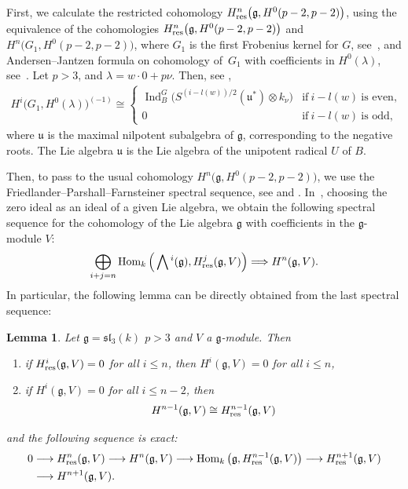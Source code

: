 \documentclass[10pt,a4paper]{amsart}
\numberwithin{equation}{section}
\newtheorem{Lemma}[Theorem]{Lemma}
\begin{document}
First, we calculate the restricted cohomology
$H^n_{\rm res}\big(\mathfrak{g},H^0(p-2,p-2)\big)$, using the equivalence of the cohomologies $H^n_{\rm res}\big(\mathfrak{g},H^0(p-2,p-2)\big)$ and $H^n\big(G_1,H^0(p-2,p-2)\big)$, where $G_1$ is the first Frobenius kernel for $G$, see~\cite[Section~I.9.6]{Jan03}, and Andersen--Jantzen formula on cohomology of~$G_1$ with coefficients in $H^0(\lambda)$, see~\cite{AJ84}. Let $p>3$, and $\lambda=w\cdot 0+p\nu$. Then, see \cite[p.~501]{AJ84},
\begin{gather}
H^i\big(G_1,H^0(\lambda)\big)^{(-1)}\cong
\begin{cases}
\operatorname{Ind}_B^{G}\big(S^{(i-l(w))/2}(\mathfrak{u}^*)\otimes k_{\nu}\big)&\text{if} \ i-l(w)\ \text{is even},
\\
0&\text{if} \ i-l(w)\ \text{is odd},
\end{cases}
\label{eq13}
\end{gather}
where $\mathfrak{u}$ is the maximal nilpotent subalgebra of $\mathfrak{g}$, corresponding to the negative roots. The Lie algebra $\mathfrak{u}$ is the Lie algebra of the unipotent radical $U$ of $B$.

Then, to pass to the usual cohomology $H^n\big(\mathfrak{g},H^0(p-2,p-2)\big)$, we use the Friedlander--Parshall--Farnsteiner spectral sequence, see \cite[Section~5]{FP88} and \cite[Theorem~4.1]{F91}. In~\cite[Theo\-rem~4.1]{F91}, choosing the zero ideal as an ideal of a given Lie algebra, we obtain the following spectral sequence for the cohomology of the Lie algebra $\mathfrak{g}$ with coefficients in the $\mathfrak{g}$-module $V$:
\begin{gather*}
\bigoplus_{i+j=n}\operatorname{Hom}_k\Big(\bigwedge{^i}(\mathfrak{g}),H^j_{\rm res}(\mathfrak{g},V)\Big)\Longrightarrow H^n(\mathfrak{g},V).
\end{gather*}
In particular, the following lemma can be directly obtained from the last spectral sequence:

\begin{Lemma}\label{l5}
Let $\mathfrak{g}=\mathfrak{sl}_3(k)$
$p>3$ and $V$ a $\mathfrak{g}$-module. Then
\begin{enumerate}\itemsep=0pt

\item[$(i)$] if
$H^{i}_{\rm res}(\mathfrak{g},V)=0$ for all $i\leq n$, then $H^{i}(\mathfrak{g},V)=0$ for all $i\leq n$,

\item[$(ii)$] if $H^i(\mathfrak{g},V)=0$ for all $i\leq n-2$, then
\begin{gather}
H^{n-1}(\mathfrak{g},V)\cong H^{n-1}_{\rm res}(\mathfrak{g},V) \label{eq14}
\end{gather}
\end{enumerate}
and the following sequence is exact:
\begin{align}
0&\longrightarrow H^{n}_{\rm res}(\mathfrak{g},V)\longrightarrow H^{n}(\mathfrak{g},V)\longrightarrow \operatorname{Hom}_k\big(\mathfrak{g},H^{n-1}_{\rm res}(\mathfrak{g},V)\big)\longrightarrow H^{n+1}_{\rm res}(\mathfrak{g},V)\nonumber
\\
&\longrightarrow H^{n+1}(\mathfrak{g},V). \label{eq15}
\end{align}
\end{Lemma}
\end{document}
